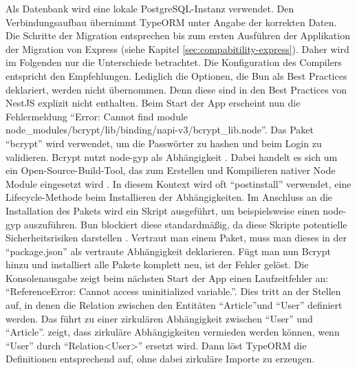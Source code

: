 \noindent
Als Datenbank wird eine lokale PostgreSQL-Instanz verwendet. Den Verbindungsaufbau übernimmt TypeORM unter Angabe der korrekten Daten. Die Schritte der Migration entsprechen bis zum ersten Ausführen der Applikation der Migration von Express (siehe Kapitel \ref{sec:compabitility-express}). Daher wird im Folgenden nur die Unterschiede betrachtet. Die Konfiguration des Compilers entspricht den Empfehlungen. Lediglich die Optionen, die Bun als Best Practices deklariert, werden nicht übernommen. Denn diese sind in den Best Practices von NestJS explizit nicht enthalten. \newline
Beim Start der App erscheint nun die Fehlermeldung ``Error: Cannot find module node\_modules/bcrypt/lib/binding/napi-v3/bcrypt\_lib.node''. Das Paket ``bcrypt'' wird verwendet, um die Passwörter zu hashen und beim Login zu validieren. Bcrypt nutzt node-gyp als Abhängigkeit \cite{DelGobbo.2018}. Dabei handelt es sich um ein Open-Source-Build-Tool, das zum Erstellen und Kompilieren nativer Node Module eingesetzt wird \cite{OpenJSFoundation.o.J.b}. In diesem Kontext wird oft ``postinstall'' verwendet, eine Lifecycle-Methode beim Installieren der Abhängigkeiten. Im Anschluss an die Installation des Pakets wird ein Skript ausgeführt, um beispielsweise einen node-gyp auszuführen. Bun blockiert diese standardmäßig, da diese Skripte potentielle Sicherheitsrisiken darstellen \cite{OvenSh.2023}. Vertraut man einem Paket, muss man dieses in der ``package.json'' als vertraute Abhängigkeit deklarieren. Fügt man nun Bcrypt hinzu und installiert alle Pakete komplett neu, ist der Fehler gelöst. \newline
Die Konsolenausgabe zeigt beim nächsten Start der App einen Laufzeitfehler an: ``ReferenceError: Cannot access uninitialized variable.''. Dies tritt an der Stellen auf, in denen die Relation zwischen den Entitäten ``Article''und ``User'' definiert werden. Das führt zu einer zirkulären Abhängigkeit zwischen ``User'' und ``Article''. \cite{TypeORM.} zeigt, dass zirkuläre Abhängigkeiten vermieden werden können, wenn ``User'' durch ``Relation<User>'' ersetzt wird. Dann löst TypeORM die Definitionen entsprechend auf, ohne dabei zirkuläre Importe zu erzeugen.\\

